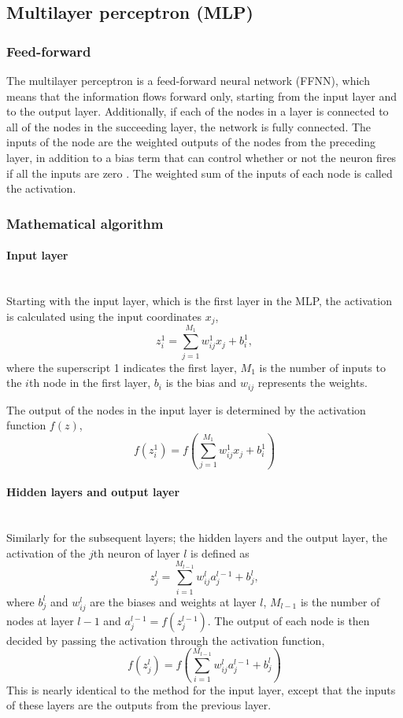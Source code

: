 \documentclass[a4paper, 11pt, twocolumn]{article}
\newcommand{\myparagraph}[1]{\paragraph{#1}\mbox{}\\}
\begin{document}
\subsection{Multilayer perceptron (MLP)}

\subsubsection{Feed-forward  }
The multilayer perceptron is a feed-forward neural network (FFNN), which means 
that the information flows forward only, starting from the input layer and to 
the output layer. Additionally, if each of the nodes in a layer is connected to 
all of the nodes in the succeeding layer, the network is fully connected. The 
inputs of the node are the weighted outputs of the nodes from the preceding 
layer, in addition to a bias term that can control whether or not the neuron 
fires if all the inputs are zero \cite{ML_algo}. The weighted sum of the inputs 
of each node is called the activation.
 
\subsubsection*{Mathematical algorithm} \myparagraph{Input layer}
Starting with the input layer, which is the first layer in the MLP, the 
activation is calculated using the input coordinates $x_j$, 
\begin{equation}
z_i^1 = \sum^{M_1}_{j=1}w_{ij}^1x_j + b_i^1,
\end{equation}
where the superscript 1 indicates the first layer, $M_1$ is the number of inputs 
to the $i$th node in the first layer, $b_i$ is the bias and $w_{ij}$ represents 
the weights.

The output of the nodes in the input layer is determined by the activation 
function $f(z)$,
\begin{equation}
f(z_i^1) = f \left( \sum^{M_1}_{j=1}w_{ij}^1x_j + b_i^1 \right)
\end{equation}
\myparagraph{Hidden layers and output layer}
Similarly for the subsequent layers; the hidden layers and the output layer, the activation of the $j$th neuron of layer $l$ is defined as
\begin{equation}
z_j^l = \sum_{i=1}^{M_{l-1}} w_{ij}^la_j^{l-1} + b_j^l,
\end{equation}
where $b_j^l$ and $w_{ij}^l$ are the biases and weights at layer $l$, ${M_{l-1}}$ 
is the number of nodes at layer $l-1$ and $a_j^{l-1}=f(z_j^{l-1}) $.
The output of each node is then decided by passing the activation through the 
activation function,
\begin{equation}
 f(z_j^l) =f \left(     \sum_{i=1}^{M_{l-1}} w_{ij}^la_j^{l-1} + b_j^l \right)
\end{equation}
This is nearly identical to the method for the input layer, except that the 
inputs of these layers are the outputs from the previous layer.
\end{document}

